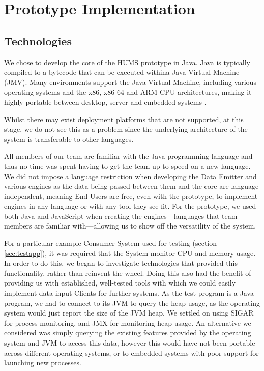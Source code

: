 \documentclass[10pt,a4paper]{article}
\begin{document}
\section{Prototype Implementation}
\label{sec:prototype}

\subsection{Technologies}

We chose to develop the core of the HUMS prototype in Java. Java is typically
compiled to a bytecode that can be executed withina Java Virtual Machine (JMV).
Many environments support the Java Virtual Machine, including various
operating systems and the x86, x86-64 and ARM CPU architectures,
making it highly portable between desktop, server and embedded
systems \cite{javasupport}.

Whilst there may exist deployment platforms that are not supported, at
this stage, we do not see this as a problem since the underlying
architecture of the system is transferable to other languages.

All members of our team are familiar with the Java programming
language and thus no time was spent having to get the team up to speed
on a new language. We did not impose a language restriction when
developing the Data Emitter and various engines as the data being
passed between them and the core are language independent, meaning 
End Users are free, even with the prototype, to implement engines in any
language or with any tool they see fit. For the prototype, we used both Java and
JavaScript when creating the engines---languages that team members are
familiar with---allowing us to show off the versatility of the system.

For a particular example Consumer System used for testing (section
\ref{sec:testapp}), it was required that the System monitor CPU and memory usage.
In order to do this, we began to investigate
technologies that provided this functionality, rather than reinvent the wheel.
Doing this also had the benefit of providing us with established, well-tested
tools with which we could easily implement data input Clients for further
systems. As the test program is a Java program, we had to connect to its 
JVM to query the heap usage, as the operating system would just report the 
size of the JVM heap. We settled on using SIGAR for process monitoring, 
and JMX for monitoring heap usage. An alternative we considered was 
simply querying the existing features provided by the operating system 
and JVM to access this data, however this would have not been portable 
across different operating systems, or to embedded systems with poor 
support for launching new processes.
\end{document}
